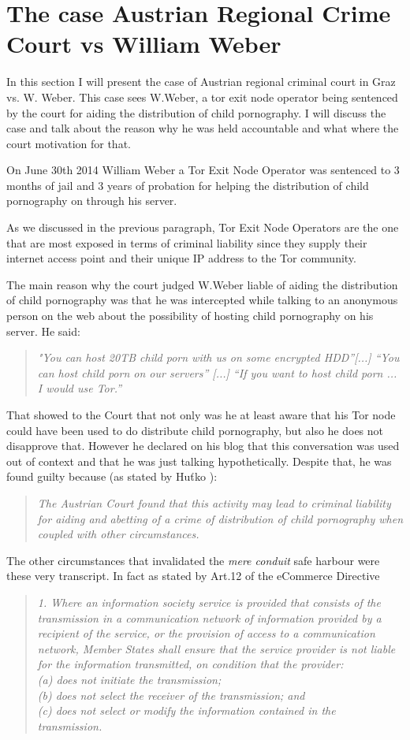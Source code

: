 \documentclass[runningheads,a4paper]{llncs}
\begin{document}
\section{The case Austrian Regional Crime Court vs William Weber}
In this section I will present the case of Austrian regional criminal court in Graz vs. W. Weber. This case sees W.Weber, a tor exit node operator being sentenced by the court for aiding the distribution of child pornography. I will discuss the case and talk about the reason why he was held accountable and what where the court motivation for that.

On June 30th 2014 William Weber a Tor Exit Node Operator was sentenced to 3 months of jail and 3 years of probation for helping the distribution of child pornography on through his server.

As we discussed in the previous paragraph, Tor Exit Node Operators are the one that are most exposed in terms of criminal liability since they supply their internet access point and their unique IP address to the Tor community.

The main reason why the court judged W.Weber liable of aiding the distribution of child pornography was that he was intercepted while talking to an anonymous person on the web about the possibility of hosting child pornography on his server. He said: 
\begin{quote}
    \textit{ "You can host 20TB child porn with us on some encrypted HDD”[...] “You can host child porn on our servers” [...] “If you want to host child porn ... I would use Tor.”}
\end{quote}
That showed to the Court that not only was he at least aware that his Tor node could have been used to do distribute child pornography, but also he does not disapprove that.
However he declared on his blog that this conversation was used out of context and that he was just talking hypothetically. 
Despite that, he was found guilty because (as stated by Huťko \cite{HUSOVEC}):
\begin{quote}
\textit{
    The Austrian Court found that this activity may lead to criminal liability for aiding and abetting of a crime of distribution of child pornography when coupled with other circumstances.}
\end{quote}
The other circumstances that invalidated the \textit{mere conduit} safe harbour were these very transcript. In fact as stated by Art.12 of the eCommerce Directive 
\begin{quote}
    \textit{1. Where an information society service is provided that consists of the transmission in a communication network of information provided by a recipient of the service, or the provision of access to a communication network, Member States shall ensure that the service provider is not liable for the information transmitted, on condition that the provider:\\
(a) does not initiate the transmission;\\
(b) does not select the receiver of the transmission; and\\
(c) does not select or modify the information contained in the transmission.}
\end{quote}
\end{document}

